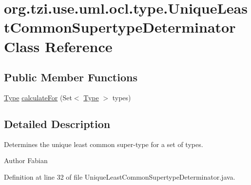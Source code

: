 \hypertarget{classorg_1_1tzi_1_1use_1_1uml_1_1ocl_1_1type_1_1_unique_least_common_supertype_determinator}{\section{org.\-tzi.\-use.\-uml.\-ocl.\-type.\-Unique\-Least\-Common\-Supertype\-Determinator Class Reference}
\label{classorg_1_1tzi_1_1use_1_1uml_1_1ocl_1_1type_1_1_unique_least_common_supertype_determinator}
}
\subsection*{Public Member Functions}
\begin{DoxyCompactItemize}
\item 
\hyperlink{interfaceorg_1_1tzi_1_1use_1_1uml_1_1ocl_1_1type_1_1_type}{Type} \hyperlink{classorg_1_1tzi_1_1use_1_1uml_1_1ocl_1_1type_1_1_unique_least_common_supertype_determinator_a886dbf1b7481ec962a84c2670e252a91}{calculate\-For} (Set$<$ \hyperlink{interfaceorg_1_1tzi_1_1use_1_1uml_1_1ocl_1_1type_1_1_type}{Type} $>$ types)
\end{DoxyCompactItemize}


\subsection{Detailed Description}
Determines the unique least common super-\/type for a set of types. \begin{DoxyAuthor}{Author}
Fabian 
\end{DoxyAuthor}


Definition at line 32 of file Unique\-Least\-Common\-Supertype\-Determinator.\-java.



